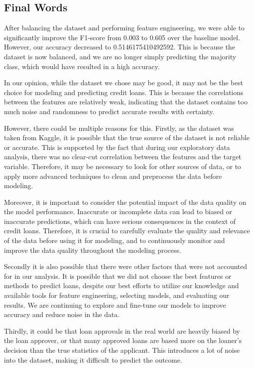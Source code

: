 \documentclass[sigplan]{acmart}
\begin{document}
\subsection{Final Words}
After balancing the dataset and performing feature engineering, we were able to significantly improve the F1-score from 0.003 to 0.605 over the baseline model. However, our accuracy decreased to 0.5146175410492592. This is because the dataset is now balanced, and we are no longer simply predicting the majority class, which would have resulted in a high accuracy.

In our opinion, while the dataset we chose may be good, it may not be the best choice for modeling and predicting credit loans. This is because the correlations between the features are relatively weak, indicating that the dataset contains too much noise and randomness to predict accurate results with certainty.

However, there could be multiple reasons for this. Firstly, as the dataset was taken from Kaggle, it is possible that the true source of the dataset is not reliable or accurate. This is supported by the fact that during our exploratory data analysis, there was no clear-cut correlation between the features and the target variable. Therefore, it may be necessary to look for other sources of data, or to apply more advanced techniques to clean and preprocess the data before modeling.

Moreover, it is important to consider the potential impact of the data quality on the model performance. Inaccurate or incomplete data can lead to biased or inaccurate predictions, which can have serious consequences in the context of credit loans. Therefore, it is crucial to carefully evaluate the quality and relevance of the data before using it for modeling, and to continuously monitor and improve the data quality throughout the modeling process.

Secondly it is also possible that there were other factors that were not accounted for in our analysis. It is possible that we did not choose the best features or methods to predict loans, despite our best efforts to utilize our knowledge and available tools for feature engineering, selecting models, and evaluating our results. We are continuing to explore and fine-tune our models to improve accuracy and reduce noise in the data.

Thirdly, it could be that loan approvals in the real world are heavily biased by the loan approver, or that many approved loans are based more on the loaner's decision than the true statistics of the applicant. This introduces a lot of noise into the dataset, making it difficult to predict the outcome.
\end{document}
